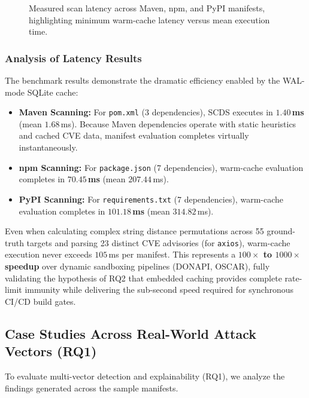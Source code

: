 \begin{figure}[t]
\centering

\caption{Measured scan latency across Maven, npm, and PyPI manifests, highlighting minimum warm-cache latency versus mean execution time.}
\label{fig:latency}
\end{figure}

\subsubsection{Analysis of Latency Results}
The benchmark results demonstrate the dramatic efficiency enabled by the WAL-mode SQLite cache:
\begin{itemize}
    \item \textbf{Maven Scanning:} For \texttt{pom.xml} (3 dependencies), SCDS executes in \textbf{$1.40$\,ms} (mean $1.68$\,ms). Because Maven dependencies operate with static heuristics and cached CVE data, manifest evaluation completes virtually instantaneously.
    \item \textbf{npm Scanning:} For \texttt{package.json} (7 dependencies), warm-cache evaluation completes in \textbf{$70.45$\,ms} (mean $207.44$\,ms).
    \item \textbf{PyPI Scanning:} For \texttt{requirements.txt} (7 dependencies), warm-cache evaluation completes in \textbf{$101.18$\,ms} (mean $314.82$\,ms).
\end{itemize}
Even when calculating complex string distance permutations across 55 ground-truth targets and parsing 23 distinct CVE advisories (for \texttt{axios}), warm-cache execution never exceeds $105$\,ms per manifest. This represents a \textbf{$100\times$ to $1000\times$ speedup} over dynamic sandboxing pipelines (DONAPI, OSCAR), fully validating the hypothesis of RQ2 that embedded caching provides complete rate-limit immunity while delivering the sub-second speed required for synchronous CI/CD build gates.

\subsection{Case Studies Across Real-World Attack Vectors (RQ1)}
To evaluate multi-vector detection and explainability (RQ1), we analyze the findings generated across the sample manifests.

